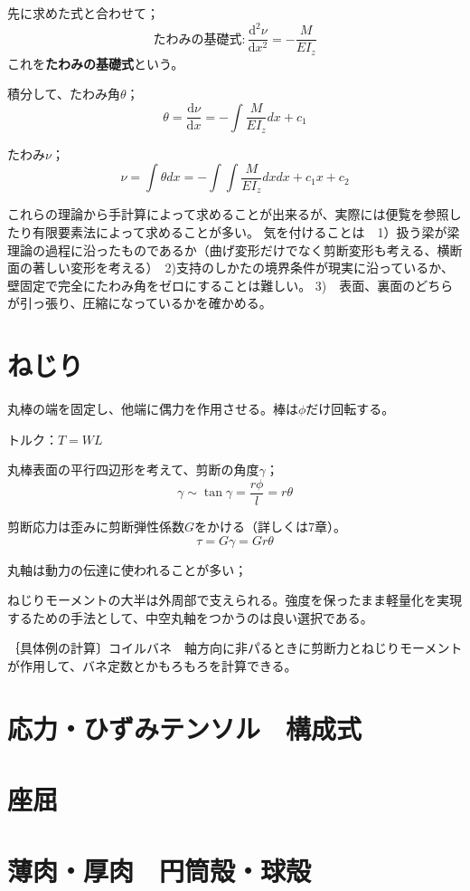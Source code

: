 \documentclass[a4j,10pt,oneside,openany]{jsbook}
\newcommand{\derivative}[2]{\frac{\mathrm{d} #1}{\mathrm{d} #2}}
\newcommand{\dderivative}[2]{\frac{\mathrm{d}^2 #1}{\mathrm{d} {#2}^2}}
\begin{document}
先に求めた式と合わせて；
\[たわみの基礎式　:　\dderivative{\nu}{x} = -\frac{M}{EI_z}\]
これを\textbf{たわみの基礎式}という。

積分して、たわみ角$\theta$；
\[\theta = \derivative{\nu}{x} = -\int \frac{M}{EI_z} dx + c_1\]

たわみ$\nu$；
\[ \nu = \int \theta dx = - \int\int \frac{M}{EI_z} dxdx +c_1x +c_2\]


これらの理論から手計算によって求めることが出来るが、実際には便覧を参照したり有限要素法によって求めることが多い。
気を付けることは　1）扱う梁が梁理論の過程に沿ったものであるか（曲げ変形だけでなく剪断変形も考える、横断面の著しい変形を考える）　2)支持のしかたの境界条件が現実に沿っているか、壁固定で完全にたわみ角をゼロにすることは難しい。
3)　表面、裏面のどちらが引っ張り、圧縮になっているかを確かめる。

\section{ねじり}

丸棒の端を固定し、他端に偶力を作用させる。棒は$\phi$だけ回転する。

トルク：$T= WL$

丸棒表面の平行四辺形を考えて、剪断の角度$\gamma$；
\[ \gamma \sim \tan \gamma =\frac{r\phi}{l} = r\theta\]

剪断応力は歪みに剪断弾性係数$G$をかける（詳しくは7章）。
\[\tau = G \gamma = G r \theta\]


丸軸は動力の伝達に使われることが多い；

ねじりモーメントの大半は外周部で支えられる。強度を保ったまま軽量化を実現するための手法として、中空丸軸をつかうのは良い選択である。


｛具体例の計算〕コイルバネ　軸方向に非パるときに剪断力とねじりモーメントが作用して、バネ定数とかもろもろを計算できる。





\section{応力・ひずみテンソル　構成式}
\section{座屈}
\section{薄肉・厚肉　円筒殻・球殻}
\end{document}
